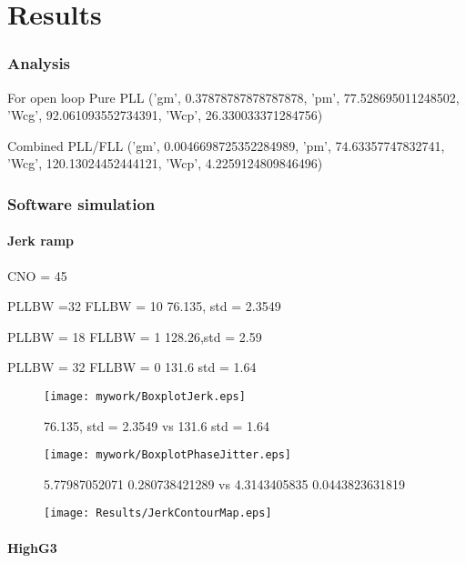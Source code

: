 \chapter{Results}\label{ch:Results}

\subsection{Analysis}

For open loop
Pure PLL
('gm', 0.37878787878787878, 'pm', 77.528695011248502, 'Wcg', 92.061093552734391, 'Wcp', 26.330033371284756)

Combined PLL/FLL
('gm', 0.0046698725352284989, 'pm', 74.63357747832741, 'Wcg', 120.13024452444121, 'Wcp', 4.2259124809846496)


\subsection{Software simulation}

\subsubsection{Jerk ramp}
CNO = 45

PLLBW =32
FLLBW = 10
76.135, std = 2.3549

PLLBW = 18
FLLBW = 1
128.26,std =  2.59 

PLLBW = 32
FLLBW = 0
131.6 std = 1.64

\begin{figure}[!htb] 
    \centering
    \texttt{[image: mywork/BoxplotJerk.eps]} 
    \caption{ 76.135, std = 2.3549 vs 131.6 std = 1.64}
    \label{fig:BoxplotJerk}
\end{figure}

\begin{figure}[!htb] 
    \centering
    \texttt{[image: mywork/BoxplotPhaseJitter.eps]} 
    \caption{5.77987052071 0.280738421289 vs 4.3143405835 0.0443823631819}
    \label{fig:BoxplotPhaseJitter}
\end{figure}


\begin{figure}[!htb] 
    \centering
    \texttt{[image: Results/JerkContourMap.eps]} 
    \caption{}
    \label{fig:JerkContourMap}
\end{figure}


\clearpage

\subsubsection{HighG3}

